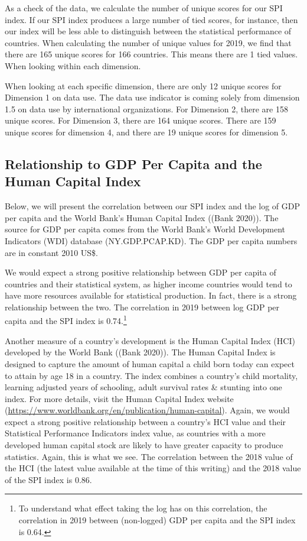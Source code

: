 \documentclass[
]{article}
\begin{document}
As a check of the data, we calculate the number of unique scores for our SPI index. If our SPI index produces a large number of tied scores, for instance, then our index will be less able to distinguish between the statistical performance of countries. When calculating the number of unique values for 2019, we find that there are 165 unique scores for 166 countries. This means there are 1 tied values. When looking within each dimension.

When looking at each specific dimension, there are only 12 unique scores for Dimension 1 on data use. The data use indicator is coming solely from dimension 1.5 on data use by international organizations. For Dimension 2, there are 158 unique scores. For Dimension 3, there are 164 unique scores. There are 159 unique scores for dimension 4, and there are 19 unique scores for dimension 5.

\hypertarget{relationship-to-gdp-per-capita-and-the-human-capital-index}{%
\subsection{Relationship to GDP Per Capita and the Human Capital Index}\label{relationship-to-gdp-per-capita-and-the-human-capital-index}}

Below, we will present the correlation between our SPI index and the log of GDP per capita and the World Bank's Human Capital Index ((Bank 2020)). The source for GDP per capita comes from the World Bank's World Development Indicators (WDI) database (NY.GDP.PCAP.KD). The GDP per capita numbers are in constant 2010 US\$.

We would expect a strong positive relationship between GDP per capita of countries and their statistical system, as higher income countries would tend to have more resources available for statistical production. In fact, there is a strong relationship between the two. The correlation in 2019 between log GDP per capita and the SPI index is 0.74.\footnote{To understand what effect taking the log has on this correlation, the correlation in 2019 between (non-logged) GDP per capita and the SPI index is 0.64.}

Another measure of a country's development is the Human Capital Index (HCI) developed by the World Bank ((Bank 2020)). The Human Capital Index is designed to capture the amount of human capital a child born today can expect to attain by age 18 in a country. The index combines a country's child mortality, learning adjusted years of schooling, adult survival rates \& stunting into one index. For more details, visit the Human Capital Index website (\url{https://www.worldbank.org/en/publication/human-capital}). Again, we would expect a strong positive relationship between a country's HCI value and their Statistical Performance Indicators index value, as countries with a more developed human capital stock are likely to have greater capacity to produce statistics. Again, this is what we see. The correlation between the 2018 value of the HCI (the latest value available at the time of this writing) and the 2018 value of the SPI index is 0.86.
\end{document}

